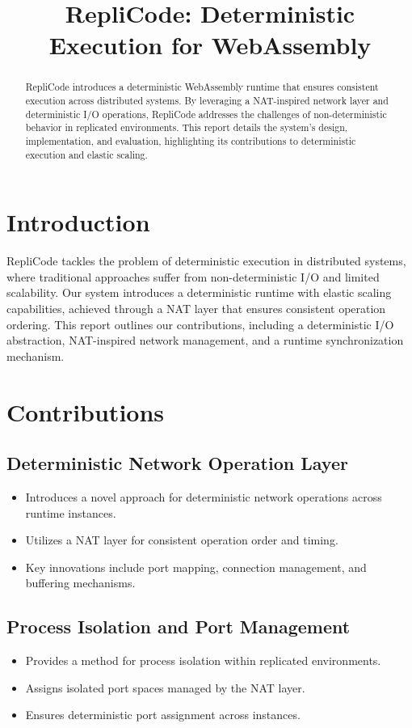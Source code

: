 \documentclass[10pt, 
]{IEEEtran}
\title{RepliCode: Deterministic Execution for WebAssembly}
\author{
    \IEEEauthorblockN{Ricardo Perelló Mas}
    \IEEEauthorblockA{
        EPFL \\
        ricardo.perellomas@epfl.ch
    }
}
\begin{document}
\maketitle

\begin{abstract}
RepliCode introduces a deterministic WebAssembly runtime that ensures consistent execution across distributed systems. By leveraging a NAT-inspired network layer and deterministic I/O operations, RepliCode addresses the challenges of non-deterministic behavior in replicated environments. This report details the system's design, implementation, and evaluation, highlighting its contributions to deterministic execution and elastic scaling.
\end{abstract}

\section{Introduction}
RepliCode tackles the problem of deterministic execution in distributed systems, where traditional approaches suffer from non-deterministic I/O and limited scalability. Our system introduces a deterministic runtime with elastic scaling capabilities, achieved through a NAT layer that ensures consistent operation ordering. This report outlines our contributions, including a deterministic I/O abstraction, NAT-inspired network management, and a runtime synchronization mechanism.

\section{Contributions}
\subsection{Deterministic Network Operation Layer}
\begin{itemize}
    \item Introduces a novel approach for deterministic network operations across runtime instances.
    \item Utilizes a NAT layer for consistent operation order and timing.
    \item Key innovations include port mapping, connection management, and buffering mechanisms.
\end{itemize}

\subsection{Process Isolation and Port Management}
\begin{itemize}
    \item Provides a method for process isolation within replicated environments.
    \item Assigns isolated port spaces managed by the NAT layer.
    \item Ensures deterministic port assignment across instances.
\end{itemize}
\end{document}
